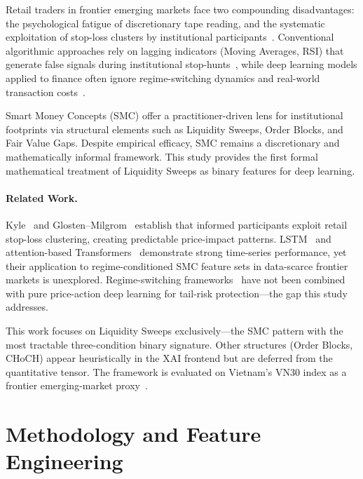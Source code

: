 \documentclass[runningheads]{llncs}
\begin{document}
Retail traders in frontier emerging markets face two compounding disadvantages: the psychological fatigue of discretionary tape reading, and the systematic exploitation of stop-loss clusters by institutional participants~\cite{kyle1985continuous,amihud2002illiquidity}. Conventional algorithmic approaches rely on lagging indicators (Moving Averages, RSI) that generate false signals during institutional stop-hunts~\cite{pring2002technical}, while deep learning models applied to finance often ignore regime-switching dynamics and real-world transaction costs~\cite{mdpi2024review,almgren2001optimal}.

Smart Money Concepts (SMC) offer a practitioner-driven lens for institutional footprints via structural elements such as Liquidity Sweeps, Order Blocks, and Fair Value Gaps. Despite empirical efficacy, SMC remains a discretionary and mathematically informal framework. This study provides the first formal mathematical treatment of Liquidity Sweeps as binary features for deep learning.

\paragraph{Related Work.}
Kyle~\cite{kyle1985continuous} and Glosten--Milgrom~\cite{glosten1985bid} establish that informed participants exploit retail stop-loss clustering, creating predictable price-impact patterns. LSTM~\cite{hochreiter1997,fischer2018deep} and attention-based Transformers~\cite{vaswani2017,nie2022patchtst,li2024itransformer} demonstrate strong time-series performance, yet their application to regime-conditioned SMC feature sets in data-scarce frontier markets is unexplored. Regime-switching frameworks~\cite{hamilton1989new,guidolin2011markov} have not been combined with pure price-action deep learning for tail-risk protection---the gap this study addresses.

This work focuses on Liquidity Sweeps exclusively---the SMC pattern with the most tractable three-condition binary signature. Other structures (Order Blocks, CHoCH) appear heuristically in the XAI frontend but are deferred from the quantitative tensor. The framework is evaluated on Vietnam's VN30 index as a frontier emerging-market proxy~\cite{bekaert1995time}.

\section{Methodology and Feature Engineering}
\end{document}
